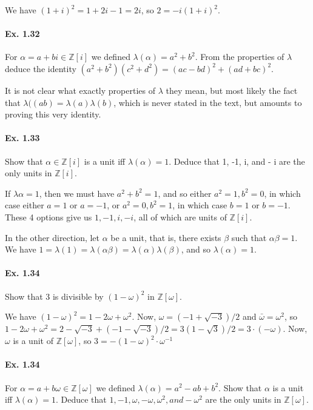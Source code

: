 \documentclass[notitlepage]{article}
\theoremstyle{definition}
\newcommand\Z{\mathbb{Z}}
\begin{document}
We have $(1+i)^2 = 1 + 2i -1 = 2i$, so $2 = -i(1+i)^2$.

\paragraph{Ex. 1.32}
For $\alpha = a + bi \in \Z[i]$ we defined $\lambda(\alpha) =
a^2 + b^2$. From the properties of $\lambda$ deduce the identity $(a^2
+ b^2)(c^2 + d^2) = (ac - bd)^2 + (ad + bc)^2$.

It is not clear what exactly properties of $\lambda$ they mean, but
most likely the fact that $\lambda((ab) = \lambda(a)\lambda(b)$, which
is never stated in the text, but amounts to proving this very
identity.

\paragraph{Ex. 1.33}
Show that $\alpha \in \Z[i]$ is a unit iff  $\lambda(\alpha) = 1$. Deduce that 1, -1, i, and - i are the only units in $\Z[i]$.

If $\lambda{\alpha} = 1$, then we must have $a^2 + b^2 = 1$, and so
either $a^2 = 1, b^2 = 0$, in which case either $a = 1$ or $a = -1$,
or $a^2 = 0, b^2 = 1$, in which case $b = 1$ or $b = -1$. These 4
options give us $1, -1, i, -i$, all of which are units of $\Z[i]$.

In the other direction, let $\alpha$ be a unit, that is, there exists
$\beta$ such that $\alpha \beta = 1$. We have $1 = \lambda(1) =
\lambda(\alpha\beta) = \lambda(\alpha)\lambda(\beta)$, and so
$\lambda(\alpha) = 1$.

\paragraph{Ex. 1.34}
Show that 3 is divisible by $(1 - \omega)^2$ in $\Z[\omega]$.

We have $(1 - \omega)^2 = 1 - 2\omega + \omega^2$. Now, $\omega =
(-1+\sqrt{-3})/2$ and $\bar{\omega} = \omega^2$, so $1 - 2\omega +
\omega^2 = 2 - \sqrt{-3}+(-1-\sqrt{-3})/2 = 3(1-\sqrt{3})/2 =
3\cdot(-\omega)$. Now, $\omega$ is a unit of $\Z[\omega]$, so
$3 = -(1 - \omega)^2 \cdot \omega^{-1}$

\paragraph{Ex. 1.34}
For $\alpha = a + b\omega \in \Z[\omega]$ we defined
$\lambda(\alpha) = a^2 - ab + b^2$. Show that $\alpha$ is a unit iff
$\lambda(\alpha) = 1$. Deduce that $1, -1, \omega, -\omega, \omega^2 ,
and -\omega^2$ are the only units in $\Z[\omega]$.
\end{document}
